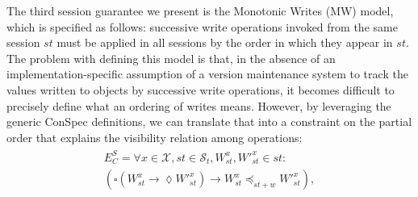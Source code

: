 \documentclass[journal, compsoc]{IEEEtran}
\begin{document}
	The third session guarantee we present is the Monotonic Writes (MW) model, which is specified as follows: successive write operations invoked from the same session $st$ must be applied in all sessions by the order in which they appear in $st$. The problem with defining this model is that, in the absence of an implementation-specific assumption of a version maintenance system to track the values written to objects by successive write operations, it becomes difficult to precisely define what an ordering of writes means. However, by leveraging the generic ConSpec definitions, we can translate that into a constraint on the partial order that explains the visibility relation among operations:
	\begin{align}\label{eqn:MW}
	\begin{split}
	E^S_C =   \forall x \in \mathcal{X}, \mathit{st} \in \mathcal{S}_t, W_\mathit{st}^x, W'^x_\mathit{st} \in \mathit{st}: \\ \left( \square \left( W_\mathit{st}^x \rightarrow \lozenge W'^{x}_\mathit{st} \right)
	\rightarrow W_\mathit{st}^x \preccurlyeq_{\mathit{st}+w} W'^{x}_\mathit{st} \right),

\end{split}
\end{align}
\end{document}
